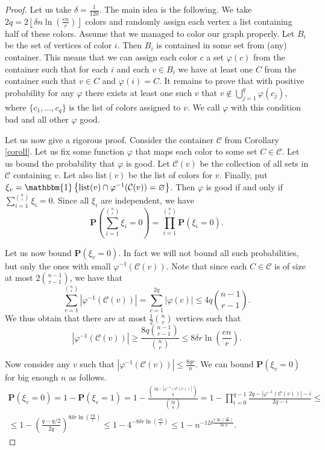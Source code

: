 \documentclass[12pt]{article}
\theoremstyle{remark}
\theoremstyle{definition}
\newcommand{\mP}{\mathbf{P}}
\newcommand{\lst}{\mathrm{list}}
\newcommand{\ind}[1]{\mathbbm{1}\left\{#1\right\}}
\newcommand{\skob}[1]{\left(#1\right)}
\newcommand{\flr}[1]{\left\lfloor#1\right\rfloor}
\begin{document}
\begin{proof}
    	Let us take $\delta = \frac{1}{120}$. The main idea is the following. We take $2q = 2\flr{\delta n \ln\skob{\frac{en}{r}}}$ colors and randomly assign each vertex a list containing half of these colors. Assume that we managed to color our graph properly. Let $B_i$ be the set of vertices of color $i$. Then $B_i$ is contained in some set from (any) container. This means that we can assign each color $c$ a set $\varphi(c)$ from the container such that for each $i$ and each $v \in B_i$ we have at least one $C$ from the container such that $v \in C$ and $\varphi(i) = C$. It remains to prove that with positive probability for any $\varphi$ there exists at least one such $v$ that $v \notin \bigcup_{j = 1}^{q} \varphi(c_j)$, where $\{c_1, \dotsc, c_q\}$ is the list of colors assigned to $v$. We call $\varphi$ with this condition bad and all other $\varphi$ good.

    	Let us now give a rigorous proof. Consider the container $\mathcal{C}$ from Corollary \ref{coroll}. Let us fix some function $\varphi$ that maps each color to some set $C \in \mathcal{C}$. Let us bound the probability that $\varphi$ is good. Let $\mathcal{C}(v)$ be the collection of all sets in $\mathcal{C}$ containing $v$. Let also $\lst(v)$ be the list of colors for $v$. Finally, put $\xi_v = \ind{\lst(v) \cap \varphi^{-1}(\mathcal{C}(v)) = \varnothing}$. Then $\varphi$ is good if and only if $\sum_{i =1}^{\binom{n}{r}}\xi_i = 0$. Since all $\xi_i$ are independent, we have
    	$$
		\mP\skob{\sum_{i = 1}^{\binom{n}{r}}\xi_i = 0} = \prod_{i = 1}^{\binom{n}{r}}\mP(\xi_i = 0).
    	$$

    	Let us now bound $\mP(\xi_v = 0)$. In fact we will not bound all such probabilities, but only the ones with small $\varphi^{-1}(\mathcal{C}(v))$. Note that since each $C \in \mathcal{C}$ is of size at most $2\binom{n-1}{r-1}$, we have that 
    	$$
    		\sum_{v = 1}^{\binom{n}{r}}|\varphi^{-1}(\mathcal{C}(v))| = \sum_{c = 1}^{2q}|\varphi(c)| \leq 4q\binom{n-1}{r-1}.
    	$$
    	We thus obtain that there are at most $\frac{1}{2}\binom{n}{r}$ vertices such that 
    	$$
    		|\varphi^{-1}(\mathcal{C}(v))| \geq \frac{8q\binom{n-1}{r-1}}{\binom{n}{r}} \leq 8\delta r \ln\skob{\frac{en}{r}}.
    	$$

	Now consider any $v$ such that $|\varphi^{-1}(\mathcal{C}(v))| \leq  \frac{8qr}{n}$. We can bound $\mP(\xi_v = 0)$ for big enough $n$ as follows.
    	\begin{multline*}
		\mP(\xi_v = 0) = 1- \mP(\xi_v = 1) = 1 -\frac{\binom{2q-|\varphi^{-1}(\mathcal{C}(v))|}{q}}{\binom{2q}{q}} = 1 -\prod_{i = 0}^{q-1}\frac{2q-|\varphi^{-1}(\mathcal{C}(v))| - i}{2q-i} \leq \\ \leq 1 - \skob{\frac{q - q/2}{2q}}^{ 8\delta r \ln\skob{\frac{en}{r}}} \leq 1 - 4^{-8\delta r \ln\skob{\frac{en}{r}}} \leq 1 - n^{-12\delta\frac{r\ln\skob{\frac{en}{r}}}{\ln n}}. 
    	\end{multline*}


\end{proof}
\end{document}
